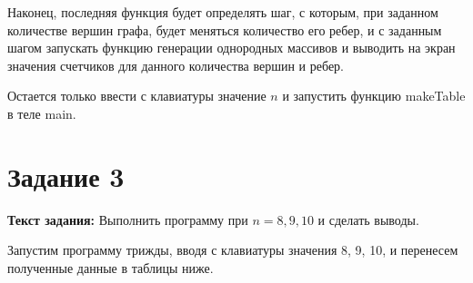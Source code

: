 \documentclass[12pt]{article}
\begin{document}
	 
	
	Наконец, последняя функция будет определять шаг, с которым, при заданном количестве вершин графа, будет меняться количество его ребер, и с заданным шагом запускать функцию генерации однородных массивов и выводить на экран значения счетчиков для данного количества вершин и ребер. 
	
	 
	
	Остается только ввести с клавиатуры значение $n$ и запустить функцию makeTable в теле main.
	
	 
	
	
	\section{Задание 3}
	\label{task3}

	{\bf Текст задания:} Выполнить программу при $n = 8, 9, 10$ и сделать выводы. 
	
	Запустим программу трижды, вводя с клавиатуры значения 8, 9, 10, и перенесем полученные данные в таблицы ниже.
	
\end{document}
